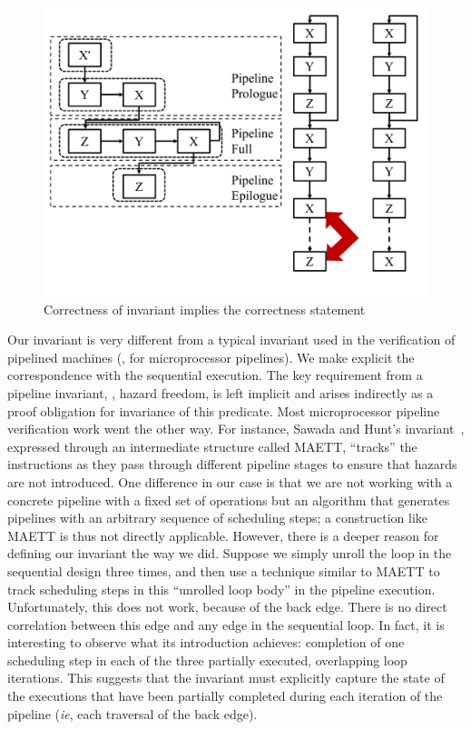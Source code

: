 \begin{figure}[t!]
\begin{center}
\includegraphics[width=5in]{fig-proposal/invariant-implies-correctness}
\end{center}
\caption{Correctness of invariant implies the correctness statement}
\label{fig:invariant-implies-correctness}
\end{figure}

Our invariant is very different from a typical invariant
used in the verification of pipelined machines (\eg, for
microprocessor pipelines).  We make explicit the
correspondence with the sequential execution.  The key
requirement from a pipeline invariant, \viz, hazard freedom,
is left implicit and arises indirectly as a proof obligation
for invariance of this predicate.  Most microprocessor
pipeline verification work went the other way.  For
instance, Sawada and Hunt's invariant~\cite{sh:pipeline},
expressed through an intermediate structure called MAETT,
``tracks'' the instructions as they pass through different
pipeline stages to ensure that hazards are not introduced.
One difference in our case is that we are not working with a
concrete pipeline with a fixed set of operations but an
algorithm that generates pipelines with an arbitrary
sequence of scheduling steps; a construction like MAETT is
thus not directly applicable.  However, there is a deeper
reason for defining our invariant the way we did.
Suppose we simply unroll the loop in the sequential
design three times, and then use a technique similar to
MAETT to track scheduling steps in this ``unrolled loop
body'' in the pipeline execution.  Unfortunately, this does
not work, because of the back edge.  There is no direct
correlation between this edge and any edge in the sequential
loop.  In fact, it is interesting to observe what its
introduction achieves: completion of one scheduling step in
each of the three partially executed, overlapping loop
iterations.  This suggests that the invariant must
explicitly capture the state of the executions that have
been partially completed during each iteration of the
pipeline ({\em ie}, each traversal of the back edge).

